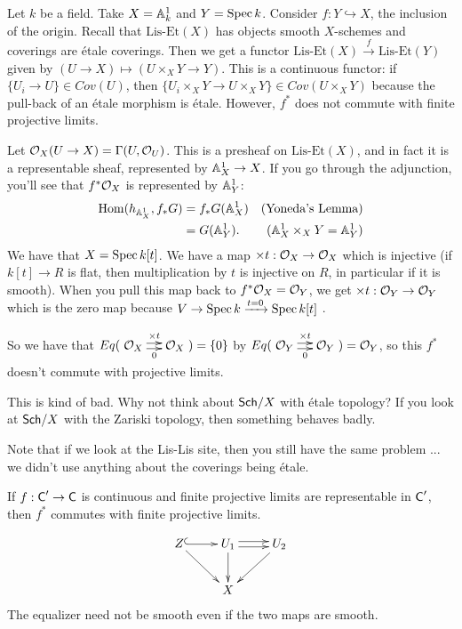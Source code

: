 \begin{example}
   Let $k$ be a field. Take $X=\AA^1_k$ and $Y=\spec k$. Consider $f:Y\hookrightarrow X$,
   the inclusion of the origin. Recall that $\text{Lis-Et}(X)$ has objects smooth
   $X$-schemes and coverings are \'etale coverings. Then we get a functor
   $\text{Lis-Et}(X)\xrightarrow{f} \text{Lis-Et}(Y)$ given by $(U\to X)\mapsto
   (U\times_X Y\to Y)$. This is a continuous functor: if $\{U_i\to U\}\in Cov(U)$, then
   $\{U_i\times_X Y\to U\times_X Y\}\in Cov (U\times_X Y)$ because the pull-back of an
   \'etale morphism is \'etale. However, $f^*$ does not commute with finite projective
   limits.

   Let $\O_X(U\to X) = \Ga(U,\O_U)$. This is a presheaf on $\text{Lis-Et}(X)$, and in
   fact it is a representable sheaf, represented by $\AA^1_X\to X$. If you go through the
   adjunction, you'll see that $f^*\O_X$ is represented by $\AA^1_Y$:
   \begin{align*}
     \hom(h_{\AA^1_X},f_*G) &= f_*G(\AA^1_X) & \text{(Yoneda's Lemma)} \\
     &= G(\AA^1_Y). & (\AA^1_X\times_X Y = \AA^1_Y)
   \end{align*}
   We have that $X = \spec k[t]$. We have a map $\times t: \O_X\to \O_X$ which is
   injective (if $k[t]\to R$ is flat, then multiplication by $t$ is injective on $R$, in
   particular if it is smooth). When you pull this map back to $f^*\O_X=\O_Y$, we get
   $\times t:\O_Y\to \O_Y$ which is the zero map because $V\to \spec
   k\xrightarrow{t=0}\spec k[t]$ \anton{}.

   So we have that $Eq(\xymatrix@-1pc{\O_X\ar@<.5ex>[r]^{\times t} \ar@<-.5ex>[r]_0 & \O_X}) =
   \{0\}$ by $Eq(\xymatrix@-1pc{\O_Y\ar@<.5ex>[r]^{\times t} \ar@<-.5ex>[r]_0 & \O_Y}) =
   \O_Y$, so this $f^*$ doesn't commute with projective limits.
 \end{example}
 \begin{remark}
   This is kind of bad. Why not think about $\sch/X$ with \'etale topology?  If you look at $\sch/X$ with the Zariski topology, then something behaves
   badly.

   Note that if we look at the Lis-Lis site, then you still have the same problem ... we
   didn't use anything about the coverings being \'etale.
 \end{remark}
 \begin{theorem}
   If $f:\C'\to \C$ is continuous and finite projective limits are
   representable in $\C'$, then $f^*$ commutes with finite projective limits.
 \end{theorem}
 \[\xymatrix{
    Z\ar@{^(->}[r] \ar[dr] & U_1 \ar@<.5ex>[r] \ar@<-.5ex>[r] \ar[d] & U_2 \ar[dl]\\ & X
 }\]
 The equalizer need not be smooth even if the two maps are smooth.
